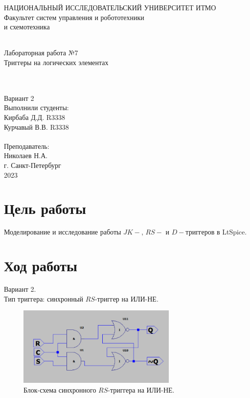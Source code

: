 \documentclass[12pt]{article}
\begin{document}
\begin{titlepage}
\begin{center}
    {\small НАЦИОНАЛЬНЫЙ ИССЛЕДОВАТЕЛЬСКИЙ УНИВЕРСИТЕТ ИТМО} \\
    {\small Факультет систем управления и робототехники} \\
    \vspace*{10\baselineskip}
    { и схемотехника} \\
    \ \\
    \begin{spacing}{1.5}
    {\large Лабораторная работа №7 \\
    Триггеры на логических элементах} \\
    \end{spacing} \\
    \ \\
    Вариант 2 \\
    \vspace*{10\baselineskip}
    \hfill {Выполнили студенты:} \\
    \hfill {Кирбаба Д.Д. R3338} \\
    \hfill {Курчавый В.В. R3338} \\
    \ \\
    \hfill {Преподаватель:} \\
    \hfill {Николаев Н.А.} \\
    \mbox{}
    \vfill {г. Санкт-Петербург\\2023}
\end{center}
\end{titlepage}

\section*{Цель работы}
Моделирование и исследование работы $JK-$, $RS-$ и $D-$триггеров в LtSpice.

\section*{Ход работы}
Вариант 2.\\
Тип триггера: синхронный $RS$-триггер на ИЛИ-НЕ.

\begin{figure}[H]
    \centering
    \includegraphics[width=0.7\textwidth]{scheme.png}
    \caption{Блок-схема синхронного $RS$-триггера на ИЛИ-НЕ.}
    \label{fig:scheme}
\end{figure}
\end{document}

